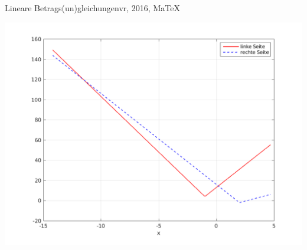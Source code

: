 \begin{MAufgabe}{Lineare Betrags(un)gleichungen}{vr, 2016, MaTeX}
 \begin{center}
 \includegraphics[width=0.8\linewidth]{Abb_zur_Ag_autogenerated_ineq_2.png} \end{center}
 
\else\relax\fi
 \end{MAufgabe}